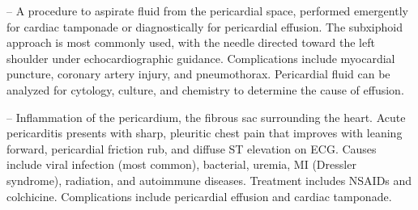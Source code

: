 -- A procedure to aspirate fluid from the pericardial space, performed emergently for cardiac tamponade or diagnostically for pericardial effusion. The subxiphoid approach is most commonly used, with the needle directed toward the left shoulder under echocardiographic guidance. Complications include myocardial puncture, coronary artery injury, and pneumothorax. Pericardial fluid can be analyzed for cytology, culture, and chemistry to determine the cause of effusion.

-- Inflammation of the pericardium, the fibrous sac surrounding the heart. Acute pericarditis presents with sharp, pleuritic chest pain that improves with leaning forward, pericardial friction rub, and diffuse ST elevation on ECG. Causes include viral infection (most common), bacterial, uremia, MI (Dressler syndrome), radiation, and autoimmune diseases. Treatment includes NSAIDs and colchicine. Complications include pericardial effusion and cardiac tamponade.

